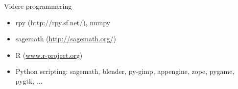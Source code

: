 \documentclass[a4paper,landscape]{slides}
\begin{document}
\begin{slide}
	\begin{center} {\large 
		Videre programmering
	} \end{center}
	\begin{itemize} \addtolength{\itemsep}{-\baselineskip}
		\item rpy (\url{http://rpy.sf.net/}), numpy
		\item sagemath (\url{http://sagemath.org/})
		\item R (\url{www.r-project.org})
		\item Python scripting: sagemath, blender, py-gimp, appengine, zope, pygame, pygtk, ...
	\end{itemize}
\end{slide}
\end{document}
